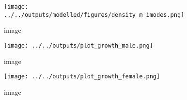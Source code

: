 \documentclass[12pt,letterpaper,]{paper}
\begin{document}
\begin{figure}
\centering
\texttt{[image: ../../outputs/modelled/figures/density\_m\_imodes.png]}
\caption{image}
\end{figure}

\begin{figure}
\centering
\texttt{[image: ../../outputs/plot\_growth\_male.png]}
\caption{image}
\end{figure}

\begin{figure}
\centering
\texttt{[image: ../../outputs/plot\_growth\_female.png]}
\caption{image}
\end{figure}





 




 

\printbibliography







% 

%  

\end{document}
